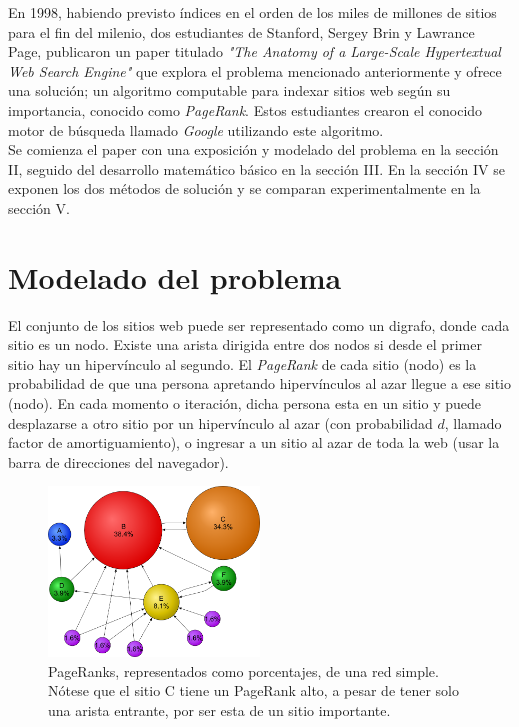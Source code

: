 \documentclass[%
    final,
    notitlepage,
    narroweqnarray,
    inline,
    twoside,
    invited
    ]{lib/ieee}
\begin{document}
En 1998, habiendo previsto índices en el orden
de los miles de millones de sitios para el fin del milenio, dos estudiantes de Stanford, Sergey Brin y Lawrance Page, publicaron un paper titulado
\textit{"The Anatomy of a Large-Scale Hypertextual Web Search Engine"} que explora el problema mencionado anteriormente y ofrece una solución; un
algoritmo computable para indexar sitios web según su importancia, conocido como \textit{PageRank}. Estos estudiantes crearon el conocido motor de
búsqueda llamado \textit{Google} utilizando este algoritmo. \\

Se comienza el paper con una exposición y modelado del problema en la sección II, seguido del desarrollo matemático básico en la sección III.
En la sección IV se exponen los dos métodos de solución y se comparan experimentalmente en la sección V.


\section{Modelado del problema}

\par El conjunto de los sitios web puede ser representado como un digrafo, donde cada sitio es un nodo. Existe una arista dirigida entre dos nodos si
desde el primer sitio hay un hipervínculo al segundo. El \textit{PageRank} de cada sitio (nodo) es la probabilidad de que una persona apretando hipervínculos al azar
llegue a ese sitio (nodo).
En cada momento o iteración, dicha persona esta en un sitio y puede desplazarse a otro sitio por un hipervínculo al azar (con probabilidad $d$,
llamado factor de amortiguamiento), o ingresar a un sitio al azar de toda la web (usar la barra de direcciones del navegador).

\begin{figure}[h!]
    \centering
    \includegraphics[width=0.5\textwidth]{img/pagerank.png} %
    \caption{PageRanks, representados como porcentajes, de una red simple. Nótese que el sitio C tiene un PageRank alto, a pesar de tener solo una arista
             entrante, por ser esta de un sitio importante.}
\end{figure}
\end{document}
